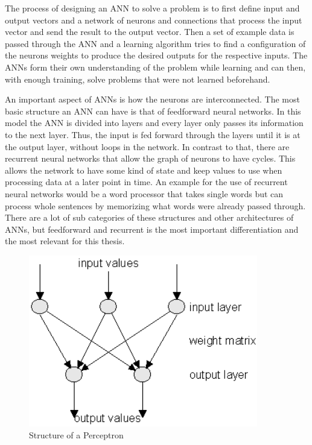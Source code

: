 The process of designing an ANN to solve a problem is to first define input and output vectors and a network of neurons and connections that process the input vector and send the result to the output vector. Then a set of example data is passed through the ANN and a learning algorithm tries to find a configuration of the neurons weights to produce the desired outputs for the respective inputs. The ANNs form their own understanding of the problem while learning and can then, with enough training, solve problems that were not learned beforehand.

An important aspect of ANNs is how the neurons are interconnected. The most basic structure an ANN can have is that of feedforward neural networks. In this model the ANN is divided into layers and every layer only passes its information to the next layer. Thus, the input is fed forward through the layers until it is at the output layer, without loops in the network. In contrast to that, there are recurrent neural networks that allow the graph of neurons to have cycles. This allows the network to have some kind of state and keep values to use when processing data at a later point in time. An example for the use of recurrent neural networks would be a word processor that takes single words but can process whole sentences by memorizing what words were already passed through. \cite{nnsAndPatternRecog} There are a lot of sub categories of these structures and other architectures of ANNs, but feedforward and recurrent is the most important differentiation and the most relevant for this thesis.\cite{introToNNs}

\begin{figure}[ht]
	\centering
  \includegraphics[width=10cm]{figures/perceptron}
	\caption[Structure of a Perceptron]{Structure of a Perceptron \protect\footnotemark}
	\label{perceptron}
\end{figure}

